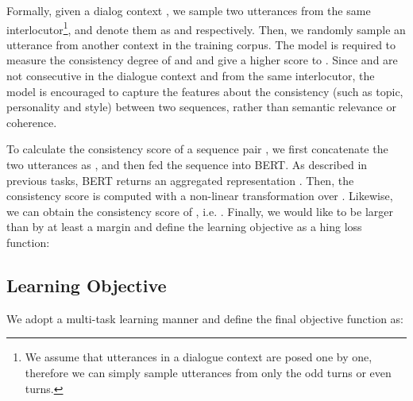 \documentclass{article}
\begin{document}
Formally, given a dialog context , we sample two utterances from the same interlocutor\footnote{We assume that utterances in a dialogue context are posed one by one, therefore we can simply sample utterances from only the odd turns or even turns.}, and denote them as  and  respectively.
Then, we randomly sample an utterance  from another context in the training corpus.
The model is required to measure the consistency degree of   and   and give a higher score to .
Since  and  are not consecutive in the dialogue context and from the same interlocutor, the model is encouraged to capture the features about the consistency (such as topic, personality and style) between two sequences, rather than semantic relevance or coherence.

To calculate the consistency score of a sequence pair , we first concatenate the two utterances
as 
, and then fed the sequence into BERT.
As described in previous tasks, BERT returns an aggregated representation .
Then, the consistency score
 is computed with a non-linear transformation over .
Likewise, we can obtain the consistency score of , i.e. .
Finally, we would like  to be larger than  by at least a margin  and define
the learning objective as a hing loss function:



\subsection{Learning Objective}
We adopt a multi-task learning manner and define the final objective function as:
\end{document}
